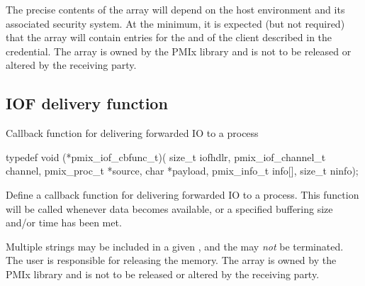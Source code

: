 \adviceuserstart
The precise contents of the array will depend on the host environment and its associated security system. At the minimum, it is expected (but not required) that the array will contain entries for the  and  of the client described in the credential. The  array is owned by the \ac{PMIx} library and is not to be released or altered by the receiving party.
\adviceuserend

\subsection{IOF delivery function}

\summary

Callback function for delivering forwarded \ac{IO} to a process

\format

\cspecificstart
\begin{codepar}
typedef void (*pmix_iof_cbfunc_t)(
                             size_t iofhdlr, pmix_iof_channel_t channel,
                             pmix_proc_t *source, char *payload,
                             pmix_info_t info[], size_t ninfo);
\end{codepar}
\cspecificend

\begin{arglist}
\end{arglist}

\descr

Define a callback function for delivering forwarded \ac{IO} to a process. This function will be called whenever data becomes available, or a
specified buffering size and/or time has been met.

\adviceuserstart
Multiple strings may be included in a given , and the  may \textit{not} be  terminated. The user is responsible for releasing the  memory. The  array is owned by the \ac{PMIx} library and is not to be released or altered by the receiving party.
\adviceuserend


